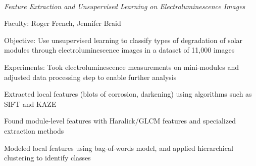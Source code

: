 \documentclass[10pt]{article}
\begin{document}
{	\
	
	\textit{Feature Extraction and Unsupervised Learning on Electroluminescence Images}
}	{\begin{newitemize}
		\item{Faculty: Roger French, Jennifer Braid}
		\item{Objective: Use unsupervised learning to classify types of degradation of solar modules through electroluminescence images in a dataset of 11,000 images}
		\item{Experiments: Took electroluminescence measurements on mini-modules and adjusted data processing step to enable further analysis}
		\item{Extracted local features (blots of corrosion, darkening) using algorithms such as SIFT and KAZE}
		\item{Found module-level features with Haralick/GLCM features and specialized extraction methods}
		\item{Modeled local features using bag-of-words model, and applied hierarchical clustering to identify classes}
		
		
	\end{newitemize}}
\end{document}
